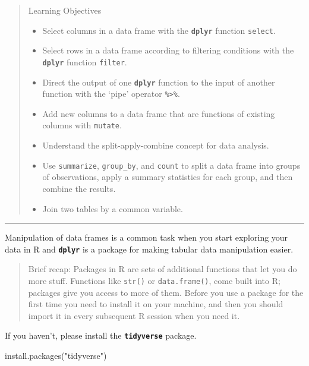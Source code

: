 \documentclass[
]{book}
\newenvironment{Shaded}{\begin{snugshade}}{\end{snugshade}}
\newcommand{\FunctionTok}[1]{\textcolor[rgb]{0.00,0.00,0.00}{#1}}
\newcommand{\NormalTok}[1]{#1}
\newcommand{\StringTok}[1]{\textcolor[rgb]{0.31,0.60,0.02}{#1}}
\providecommand{\tightlist}{%
  \setlength{\itemsep}{0pt}\setlength{\parskip}{0pt}}
\begin{document}
\begin{quote}
Learning Objectives

\begin{itemize}
\tightlist
\item
  Select columns in a data frame with the \textbf{\texttt{dplyr}} function \texttt{select}.
\item
  Select rows in a data frame according to filtering conditions with the \textbf{\texttt{dplyr}} function \texttt{filter}.
\item
  Direct the output of one \textbf{\texttt{dplyr}} function to the input of another function with the `pipe' operator \texttt{\%\textgreater{}\%}.
\item
  Add new columns to a data frame that are functions of existing columns with \texttt{mutate}.
\item
  Understand the split-apply-combine concept for data analysis.
\item
  Use \texttt{summarize}, \texttt{group\_by}, and \texttt{count} to split a data frame into groups of observations, apply a summary statistics for each group, and then combine the results.
\item
  Join two tables by a common variable.
\end{itemize}
\end{quote}

\begin{center}\rule{0.5\linewidth}{0.5pt}\end{center}

Manipulation of data frames is a common task when you start exploring your data in R and \textbf{\texttt{dplyr}} is a package for making tabular data manipulation easier.

\begin{quote}
Brief recap:
Packages in R are sets of additional functions that let you do more stuff. Functions like \texttt{str()} or \texttt{data.frame()}, come built into R; packages give you access to more of them. Before you use a package for the first time you need to install it on your machine, and then you should import it in every subsequent R session when you need it.
\end{quote}

If you haven't, please install the \textbf{\texttt{tidyverse}} package.

\begin{Shaded}
\begin{Highlighting}[]
\FunctionTok{install.packages}\NormalTok{(}\StringTok{"tidyverse"}\NormalTok{)    }
\end{Highlighting}
\end{Shaded}
\end{document}
